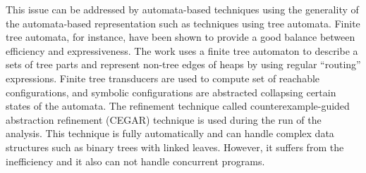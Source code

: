  
 This issue can be addressed by automata-based techniques using the generality of the automata-based representation such as techniques using tree automata. Finite tree automata, for instance, have been shown to provide a good balance between efficiency and expressiveness. The work \cite{Ahmed:TreeAutomata} uses a finite tree automaton to describe a sets of tree parts and represent non-tree edges of heaps by using regular “routing” expressions. Finite tree transducers
are used to compute set of reachable configurations, and symbolic configurations are abstracted
collapsing certain states of the automata. The refinement technique called counterexample-guided
abstraction refinement (CEGAR) technique is used during the run of the analysis. This technique
is fully automatically and can handle complex data structures such as binary trees with linked
leaves. However, it suffers from the inefficiency and it also can not handle concurrent programs.

